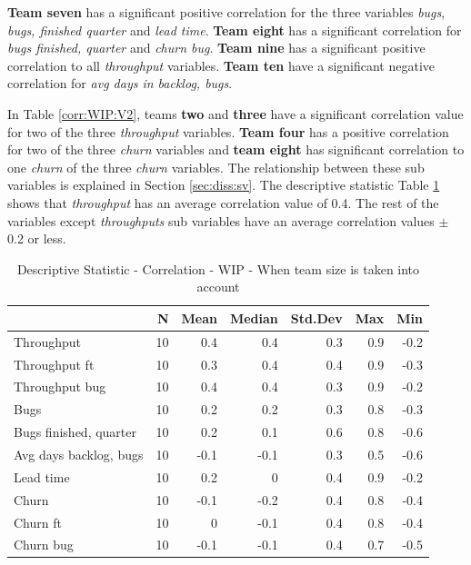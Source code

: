 \documentclass[UKenglish]{ifimaster}  %
\begin{document}
\textbf{Team seven} has a significant positive correlation for the three variables \textit{bugs}, \textit{bugs, finished quarter} and \textit{lead time}. \textbf{Team eight} has a significant correlation for \textit{bugs finished, quarter} and \textit{churn bug}. \textbf{Team nine} has a significant positive correlation to all \textit{throughput} variables. \textbf{Team ten} have a significant negative correlation for \textit{avg days in backlog, bugs}.

In Table \ref{corr:WIP:V2}, teams \textbf{two} and \textbf{three} have a significant correlation value for two of the three \textit{throughput} variables. \textbf{Team four} has a positive correlation for two of the three \textit{churn} variables and \textbf{team eight} has significant correlation to one \textit{churn} of the three \textit{churn} variables. The relationship between these sub variables is explained in Section \ref{sec:diss:sv}. The descriptive statistic Table \ref{DS:corr:WIP:v2} shows that \textit{throughput} has an average correlation value of 0.4. The rest of the variables except \textit{throughputs} sub variables have an average correlation values $\pm$ 0.2 or less. 



\begin{table}[H]
 \centering
 \begin{tabular}{ | l | r | r | r | r | r | r | }
 \hline
& \bf{N} & \bf{Mean} & \bf{Median} & \bf{Std.Dev} & \bf{Max} & \bf{Min} \\ \hline
Throughput  & 10 & 0.4 & 0.4 & 0.3 & 0.9 & -0.2\\ \hline
Throughput ft  & 10 & 0.3 & 0.4 & 0.4 & 0.9 & -0.3\\ \hline
Throughput bug  & 10 & 0.4 & 0.4 & 0.3 & 0.9 & -0.2\\ \hline
Bugs  & 10 & 0.2 & 0.2 & 0.3 & 0.8 & -0.3\\ \hline
Bugs finished, quarter  & 10 & 0.2 & 0.1 & 0.6 & 0.8 & -0.6\\ \hline
Avg days backlog, bugs  & 10 & -0.1 & -0.1 & 0.3 & 0.5 & -0.6\\ \hline
Lead time & 10 & 0.2 & 0 & 0.4 & 0.9 & -0.2\\ \hline
Churn  & 10 & -0.1 & -0.2 & 0.4 & 0.8 & -0.4\\ \hline
Churn ft  & 10 & 0 & -0.1 & 0.4 & 0.8 & -0.4\\ \hline
Churn bug  & 10 & -0.1 & -0.1 & 0.4 & 0.7 & -0.5\\ \hline
\end{tabular}
 \caption{Descriptive Statistic - Correlation - WIP - When team size is taken into account}
 \label{DS:corr:WIP:v2}
 \end{table}
\end{document}
